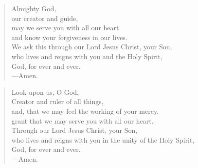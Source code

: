 \prayer

\setlength{\leftmargini}{\prayerleftmargini}

\begin{verse}
Almighty God,\\
our creator and guide,\\
may we serve you with all our heart\\
and know your forgiveness in our lives.\\
We ask this through our Lord Jesus Christ, your Son,\\
who lives and reigns with you and the Holy Spirit,\\
God, for ever and ever.\\
{\color{red}---\thinspace}Amen.
\end{verse}


\begin{verse}
Look upon us, O God,\\
Creator and ruler of all things,\\
and, that we may feel the working of your mercy,\\
grant that we may serve you with all our heart.\\
Through our Lord Jesus Christ, your Son,\\
who lives and reigns with you in the unity of the Holy Spirit,\\
God, for ever and ever.\\
{\color{red}---\thinspace}Amen.
\end{verse}

\setlength{\leftmargini}{\defleftmargini}